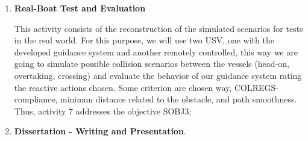 \begin{enumerate}
            \item \textbf{Real-Boat Test and Evaluation}
            
            This activity consists of the reconstruction of the simulated scenarios for tests in the real world. For this purpose, we will use two \ac{USV}, one with the developed guidance system and another remotely controlled, this way we are going to simulate possible collision scenarios between the vessels (head-on, overtaking, crossing) and evaluate the behavior of our guidance system rating the reactive actions chosen. Some criterion are chosen way, \ac{COLREGS}-compliance, minimun distance related to the obstacle, and path smoothness. Thus, activity 7 addresses the objective SOBJ3;
            
            
            
            \item \textbf{Dissertation - Writing and Presentation}.
        \end{enumerate}

